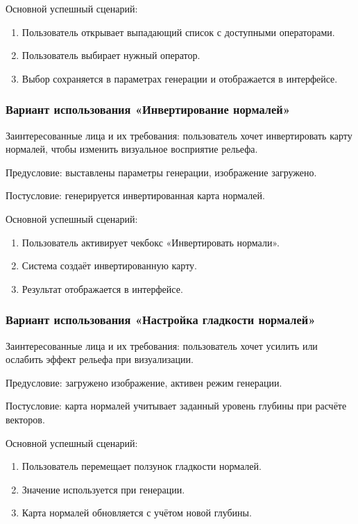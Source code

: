 Основной успешный сценарий:
\begin{enumerate}
	\item Пользователь открывает выпадающий список с доступными операторами.
	\item Пользователь выбирает нужный оператор.
	\item Выбор сохраняется в параметрах генерации и отображается в интерфейсе.
\end{enumerate}
\subsubsection{Вариант использования «Инвертирование нормалей»}

Заинтересованные лица и их требования: пользователь хочет инвертировать карту нормалей, чтобы изменить визуальное восприятие рельефа.

Предусловие: выставлены параметры генерации, изображение загружено.

Постусловие: генерируется инвертированная карта нормалей.

Основной успешный сценарий:
\begin{enumerate}
	\item Пользователь активирует чекбокс «Инвертировать нормали».
	\item Система создаёт инвертированную карту.
	\item Результат отображается в интерфейсе.
\end{enumerate}
\subsubsection{Вариант использования «Настройка гладкости нормалей»}

Заинтересованные лица и их требования: пользователь хочет усилить или ослабить эффект рельефа при визуализации.

Предусловие: загружено изображение, активен режим генерации.

Постусловие: карта нормалей учитывает заданный уровень глубины при расчёте векторов.

Основной успешный сценарий:
\begin{enumerate}
	\item Пользователь перемещает ползунок гладкости нормалей.
	\item Значение используется при генерации.
	\item Карта нормалей обновляется с учётом новой глубины.
\end{enumerate}